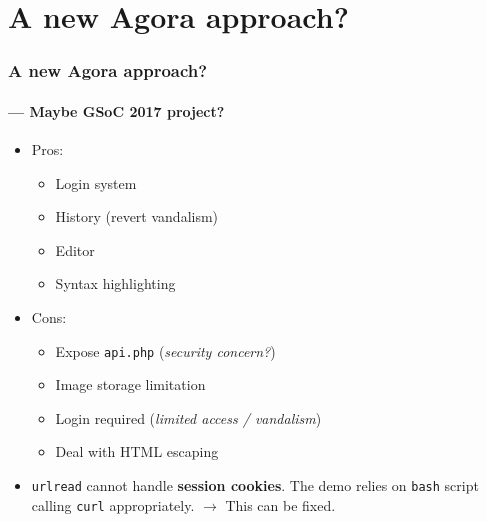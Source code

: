 \documentclass[xcolor=svgnames]{beamer}
\begin{document}
\begin{frame}
\begin{center}
\end{center}
\end{frame}



\section{A new Agora approach?}



\begin{frame}
\frametitle{A new Agora approach?}
\framesubtitle{--- Maybe GSoC 2017 project?}

\begin{itemize}
\item Pros:
  \begin{itemize}
  \item Login system
  \item History (revert vandalism)
  \item Editor
  \item Syntax highlighting
  \end{itemize}
\item Cons:
  \begin{itemize}
  \item Expose \texttt{api.php} (\textit{security concern?})
  \item Image storage limitation
  \item Login required (\textit{limited access / vandalism})
  \item Deal with HTML escaping
  \end{itemize}
\item \texttt{urlread} cannot handle \textbf{session cookies}.
  The demo relies on \texttt{bash} script calling \texttt{curl}
  appropriately. $\rightarrow$ This can be fixed.
\end{itemize}
\end{frame}
\end{document}
